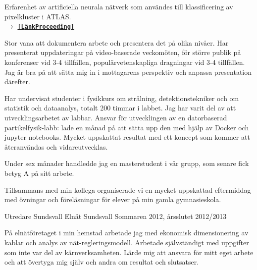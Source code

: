 \begin{cventries}
{\begin{cvitems}
\item {Erfarenhet av artificiella neurala n{\"a}tverk som anv{\"a}ndes till klassificering av pixelkluster i ATLAS. \\
$\rightarrow$  \href{https://pos.sissa.it/276/213/pdf}{{\bf \texttt{[L{\"a}nkProceeding]}}}}
\item Stor vana att dokumentera arbete och presentera det p{\aa} olika niv{\aa}er. 
		Har presenterat uppdateringar p{\aa} video-baserade veckom{\"o}ten, f{\"o}r st{\"o}rre publik p{\aa} konferenser vid 3-4 tillf{\"a}llen, popul{\"a}rvetenskapliga dragningar vid 3-4 tillf{\"a}llen.
		Jag {\"a}r bra p{\aa} att s{\"a}tta mig in i mottagarens perspektiv och anpassa presentation d{\"a}refter.
\item Har undervisat studenter i fysikkurs om str{\aa}lning,  detektionstekniker och om statistik och dataanalys, totalt 200 timmar i labbet. Jag har varit del av att utvecklingsarbetet av labbar. Ansvar f{\"o}r utvecklingen av en datorbaserad partikelfysik-labb: lade en m{\aa}nad p{\aa} att s{\"a}tta upp den med hj{\"a}lp av Docker och jupyter notebooks. Mycket uppskattat resultat med ett koncept som kommer att {\aa}teranv{\"a}ndas och vidareutvecklas.
\item Under sex m{\aa}nader handledde jag en masterstudent i v{\aa}r grupp, som senare fick betyg A p{\aa} sitt arbete.
\item Tillsammans med min kollega organiserade vi en mycket uppskattad eftermiddag med {\"o}vningar och f{\"o}rel{\"a}sningar f{\"or} elever p{\aa} min gamla gymnasieskola.
\end{cvitems}
}



\cventry
{Utredare} %
{Sundsvall Eln\"{a}t} %
{Sundsvall} %
{Sommaren 2012, {\aa}rsslutet 2012/2013} %
{ %
\begin{cvitems}
\item {P{\aa} eln{\"a}tf{\"o}retaget i min hemstad arbetade jag med ekonomisk dimensionering av kablar och analys av n{\"a}t-regleringsmodell.
		Arbetade sj{\"a}lvst{\"a}ndigt med uppgifter som inte var del av k{\"a}rnverksamheten.
		L{\"a}rde mig att ansvara f{\"o}r mitt eget arbete och att {\"o}vertyga mig sj{\"a}lv och andra om resultat och slutsatser.}
\end{cvitems}
}


\end{cventries}
